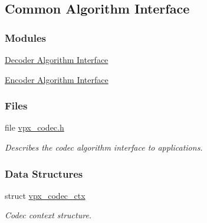 \hypertarget{group__codec}{}\subsection{Common Algorithm Interface}
\label{group__codec}
\subsubsection*{Modules}
\begin{DoxyCompactItemize}
\item 
\hyperlink{group__decoder}{Decoder Algorithm Interface}
\item 
\hyperlink{group__encoder}{Encoder Algorithm Interface}
\end{DoxyCompactItemize}
\subsubsection*{Files}
\begin{DoxyCompactItemize}
\item 
file \hyperlink{vpx__codec_8h}{vpx\+\_\+codec.\+h}
\begin{DoxyCompactList}\small\item\em Describes the codec algorithm interface to applications. \end{DoxyCompactList}\end{DoxyCompactItemize}
\subsubsection*{Data Structures}
\begin{DoxyCompactItemize}
\item 
struct \hyperlink{structvpx__codec__ctx}{vpx\+\_\+codec\+\_\+ctx}
\begin{DoxyCompactList}\small\item\em Codec context structure. \end{DoxyCompactList}\end{DoxyCompactItemize}
